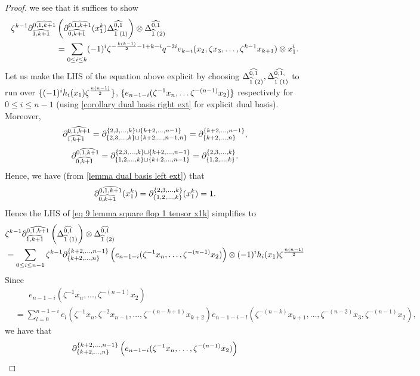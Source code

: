 \begin{proof}
    we see that it suffices to show 
    \begin{align}
       \notag \zeta^{k-1}\partial^{\widehat{0,1,k+1}}_{\widehat{1,k+1}}&\left( \partial^{\widehat{0,1,k+1}}_{\widehat{0, k+1}}(x_1^k)\Delta^{\widehat{0,1}}_{\widehat{1}\;(1)}\right) \otimes \Delta^{\widehat{0,1}}_{\widehat{1}\;(2)}\\
        &=\sum_{0\leq i \leq k} (-1)^{i}\zeta^{-\frac{k(k-1)}{2}-1+k-i}
        q^{-2i} e_{k-i}(x_2, \zeta x_3, \ldots, \zeta^{k-1}x_{k+1})\otimes x_1^{i}.\label{eq 9 lemma square flop 1 tensor x1k}
    \end{align}
    Let us make the LHS of the equation above explicit by choosing $
    \Delta^{\widehat{0,1}}_{\widehat{1}\;(2)}, \Delta^{\widehat{0,1,}}_{\widehat{1}\;(1)}$ to run over $\{(-1)^ih_i(x_1)\zeta^{\frac{n(n-1)}{2}}\}$, $\{e_{n-1-i}(\zeta^{-1}x_n, \ldots \zeta^{-(n-1)}x_2)\}$ respectively for $0 \leq i \leq n-1$ (using \cref{corollary dual basis right ext} for explicit dual basis). 
    Moreover, 
    \[\partial^{\widehat{0,1,k+1}}_{\widehat{1,k+1}}=\partial^{\{2,3, \ldots,k\}\sqcup \{k+2, \ldots, n-1\}}_{\{2,3, \ldots, k\}\sqcup\{k+2, \ldots, n-1,n\}}=\partial^{\{k+2, \ldots,n-1\}}_{\{k+2,\ldots,n\}} ,\]
    \[\partial^{\widehat{0,1,k+1}}_{\widehat{0, k+1}}=\partial^{\{2,3,\ldots,k\}\sqcup\{k+2,\ldots, n-1\}}_{\{1,2,\ldots, k\}\sqcup \{k+2,\ldots,n-1\}}=\partial^{\{2,3,\ldots,k\}}_{\{1,2,\ldots, k\}}.\]
    Hence, we have (from \cref{lemma dual basis left ext}) that
    \begin{align*}
        \partial^{\widehat{0,1,k+1}}_{\widehat{0,k+1}}(x_1^k)=\partial^{\{2,3,\ldots,k\}}_{\{1,2,\ldots, k\}}(x_1^k)=1.
    \end{align*}
    Hence  the LHS of \eqref{eq 9 lemma square flop 1 tensor x1k} simplifies to
    \begin{align}
        \notag &\zeta^{k-1}\partial^{\widehat{0,1,k+1}}_{\widehat{1,k+1}}\left(\Delta^{\widehat{0,1}}_{\widehat{1}\;(1)}\right) \otimes \Delta^{\widehat{0,1}}_{\widehat{1}\;(2)}\\
        &=\sum_{0\leq i\leq n-1}\zeta^{k-1}\partial^{\{k+2, \ldots,n-1\}}_{\{k+2,\ldots,n\}}\left( e_{n-1-i}(\zeta^{-1}x_n, \ldots ,\zeta^{-(n-1)}x_2) \right) \otimes (-1)^ih_i(x_1)\zeta^{\frac{n(n-1)}{2}} \label{eq 10 lemma square flop 1 tensor x1k}
    \end{align}
    Since
    \begin{align*}
        &\;\;\;\;\;\;e_{n-1-i}(\zeta^{-1}x_n, \ldots ,\zeta^{-(n-1)}x_2)\\
        &=\sum_{l=0}^{n-1-i}e_l(\zeta^{-1}x_n, \zeta^{-2}x_{n-1}, \ldots ,\zeta^{-(n-k+1)}x_{k+2})e_{n-1-i-l}(\zeta^{-(n-k)}x_{k+1}, \ldots ,\zeta^{-(n-2)}x_3,\zeta^{-(n-1)}x_2),
    \end{align*}
    we have that
    \begin{align*}
      &\dd^{\set{k+2, \ldots,n-1}}_{\set{k+2,\ldots,n}}\left( e_{n-1-i}(\zeta^{-1}x_n, \ldots ,\zeta^{-(n-1)}x_2) \right)  \\

\end{align*}
\end{proof}
